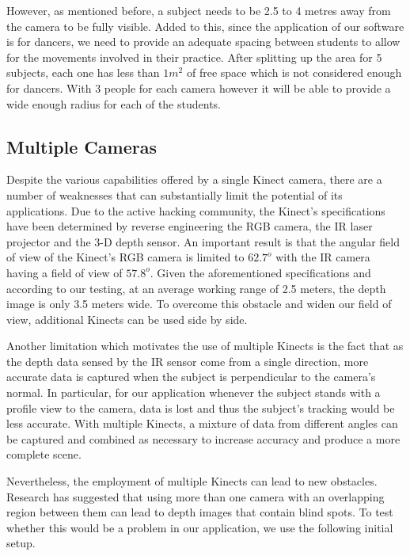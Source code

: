 \documentclass[a4paper]{article}
\begin{document}
\noindent
However, as mentioned before, a subject needs to be 2.5 to 4 metres away from the camera to be fully visible. Added to this, since the application of our software is for dancers, we need to provide an adequate spacing between students to allow for the movements involved in their practice. After splitting up the area for 5 subjects, each one has less than $1m^2$ of free space which is not considered enough for dancers. With 3 people for each camera however it will be able to provide a wide enough radius for each of the students.\\


\subsection{Multiple Cameras}
\noindent
Despite the various capabilities offered by a single Kinect camera, there are a number of weaknesses that can substantially limit the potential of its applications. Due to the active hacking community, the Kinect's specifications have been determined by reverse engineering the RGB camera, the IR laser projector and the 3-D depth sensor. An important result is that the angular field of view of the Kinect's RGB camera is limited to $62.7^o$ with the IR camera having a field of view of $57.8^o$. Given the aforementioned specifications and according to our testing, at an average working range of 2.5 meters, the depth image is only 3.5 meters wide. To overcome this obstacle and widen our field of view, additional Kinects can be used side by side. 

Another limitation which motivates the use of multiple Kinects is the fact that as the depth data sensed by the IR sensor come from a single direction, more accurate data is captured when the subject is perpendicular to the camera's normal. In particular, for our application whenever the subject stands with a profile view to the camera, data is lost and thus the subject's tracking would be less accurate. With multiple Kinects, a mixture of data from different angles can be captured and combined as necessary to increase accuracy and produce a more complete scene.

Nevertheless, the employment of multiple Kinects can lead to new obstacles. Research has suggested that using more than one camera with an overlapping region between them can lead to depth images that contain blind spots. To test whether this would be a problem in our application, we use the following initial setup.
\end{document}
